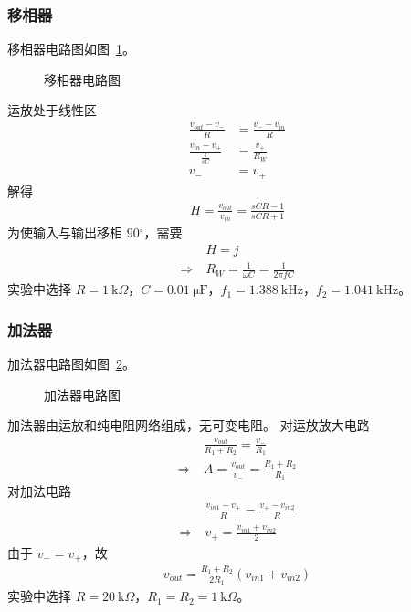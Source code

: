 \documentclass[utf8,twocolumn]{article}
\begin{document}
\subsubsection{移相器}
移相器电路图如图~\ref{circ:phase-shifter}。
\begin{figure}[H]
\centering
\scalebox{0.8}{
    
}
\caption{移相器电路图}
\label{circ:phase-shifter}
\end{figure}
运放处于线性区
\begin{align}
    \frac{v_{out} - v_-}{R} &= \frac{v_- - v_{in}}{R} \\
    \frac{v_{in} - v_+}{\frac{1}{sC}} &= \frac{v_+}{R_W} \\
    v_- &= v_+
\end{align}
解得
\begin{align}
    H = \frac{v_{out}}{v_{in}} = \frac{sCR - 1}{sCR + 1}
\end{align}
为使输入与输出移相 $ 90\mathrm{^\circ} $，需要
\begin{align}
    &H = j \\
    \Rightarrow ~ &R_W = \frac{1}{\omega C} = \frac{1}{2\pi f C}
\end{align}
实验中选择 $ R = 1~\mathrm{k}\Omega $，$ C = 0.01~\mathrm{\mu F} $，$ f_1 = 1.388~\mathrm{kHz} $，$ f_2 = 1.041~\mathrm{kHz} $。

\subsubsection{加法器}
加法器电路图如图~\ref{circ:adder}。
\begin{figure}[H]
\centering
\scalebox{0.8}{
    
}
\caption{加法器电路图}
\label{circ:adder}
\end{figure}
加法器由运放和纯电阻网络组成，无可变电阻。
对运放放大电路
\begin{align}
    &\frac{v_{out}}{R_1 + R_2} = \frac{v_-}{R_1} \\
    \Rightarrow ~ &A = \frac{v_{out}}{v_-} = \frac{R_1 + R_2}{R_1}
\end{align}
对加法电路
\begin{align}
    &\frac{v_{in1} - v_+}{R} = \frac{v_+ - v_{in2}}{R} \\
    \Rightarrow ~ &v_{+} = \frac{v_{in1} + v_{in2}}{2}
\end{align}
由于 $ v_- = v_+ $，故
\begin{align}
    v_{out} = \frac{R_1 + R_2}{2R_1}\left(v_{in1} + v_{in2}\right)
\end{align}
实验中选择 $ R = 20~\mathrm{k}\Omega $，$ R_1 = R_2 = 1~\mathrm{k}\Omega $。
\end{document}

